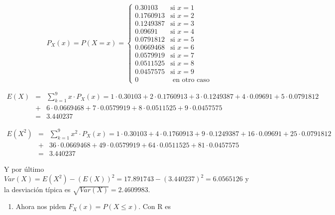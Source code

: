\documentclass[
]{article}
\providecommand{\tightlist}{%
  \setlength{\itemsep}{0pt}\setlength{\parskip}{0pt}}
\begin{document}
\[
P_X(x)=P(X=x)=\left\{
\begin{array}{ll}
0.30103 &  \mbox{si } x=1\\
0.1760913 &  \mbox{si } x=2\\
0.1249387 &  \mbox{si } x=3\\
0.09691 &  \mbox{si } x=4\\
0.0791812 &  \mbox{si } x=5\\
0.0669468 &  \mbox{si } x=6\\
0.0579919 &  \mbox{si } x=7\\
0.0511525 &  \mbox{si } x=8\\
0.0457575 &  \mbox{si } x=9\\
0 & \mbox{ en otro caso}
\end{array}
\right.
\]

\begin{eqnarray*}
E(X) &=& \sum_{k=1}^9 x\cdot P_X(x)= 1 \cdot 0.30103+ 2 \cdot 0.1760913+3 \cdot 0.1249387+4 \cdot 0.09691+5 \cdot 0.0791812\\
     &+&  6 \cdot 0.0669468+ 7 \cdot 0.0579919+ 8 \cdot 0.0511525+9 \cdot 0.0457575\\
     &=& 3.440237
\end{eqnarray*}

\begin{eqnarray*}
E(X^2) &=& \sum_{k=1}^9 x^2\cdot P_X(x)= 1 \cdot 0.30103+ 4 \cdot 0.1760913+9 \cdot 0.1249387+ 16 \cdot 0.09691+25 \cdot 0.0791812\\
     &+&  36 \cdot 0.0669468+ 49 \cdot 0.0579919+ 64 \cdot 0.0511525+81 \cdot 0.0457575\\
     &=& 3.440237
\end{eqnarray*}

Y por último \(Var(X)=E(X^2)-(E(X))^2=17.891743-(3.440237)^2=6.0565126\)
y la desviación típica es \(\sqrt{Var(X)}=2.4609983.\)

\begin{enumerate}
\def\labelenumi{\alph{enumi})}
\setcounter{enumi}{1}
\tightlist
\item
  Ahora nos piden \(F_X(x)=P(X\leq x)\). Con R es
\end{enumerate}
\end{document}

